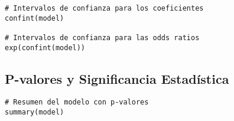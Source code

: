 \begin{verbatim}
# Intervalos de confianza para los coeficientes
confint(model)

# Intervalos de confianza para las odds ratios
exp(confint(model))
\end{verbatim}

\subsection{P-valores y Significancia Estad\'istica}

\begin{verbatim}
# Resumen del modelo con p-valores
summary(model)
\end{verbatim}

